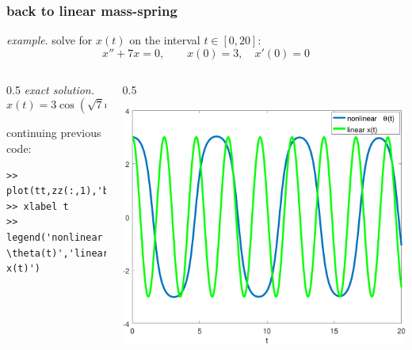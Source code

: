 \documentclass[dvipsnames,colorlinks]{beamer}
\begin{document}
\begin{frame}[fragile]
\frametitle{back to linear mass-spring}

\small

\noindent \hspace{-4mm} \emph{example}.  solve for $x(t)$ on the interval $t\in [0,20]$:
    $$x''+ 7 x = 0, \qquad x(0)=3, \quad x'(0)=0$$

\begin{columns}
\begin{column}{0.5\textwidth}
\noindent \emph{exact solution.}
    $$x(t)=3 \cos(\sqrt{7} t)$$

\vspace{28mm}
continuing previous code:
\begin{Verbatim}[fontsize=\footnotesize]
>> plot(tt,zz(:,1),'b',tt,3*cos(sqrt(7)*tt),'g')
>> xlabel t
>> legend('nonlinear \theta(t)','linear x(t)')
\end{Verbatim}
\end{column}
\begin{column}{0.5\textwidth}

\vspace{-10mm}
\includegraphics[width=1.0\textwidth]{figs/pend-compare}
\end{column}
\end{columns}
\end{frame}
\end{document}
